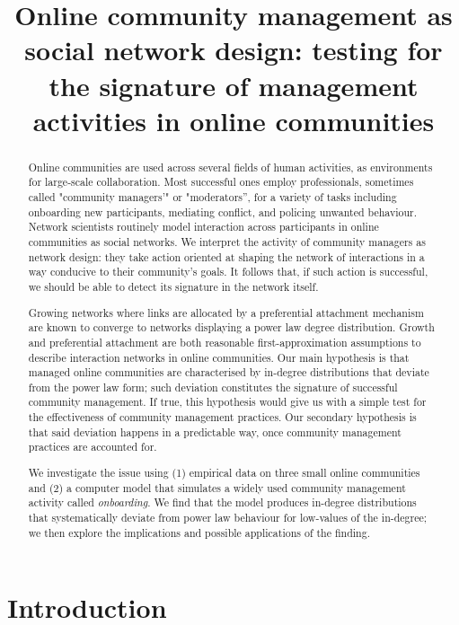\documentclass{nws}
\title[Online community management as social network design]{Online community management as social network design: testing for the signature of management activities in online communities}
\begin{document}
\label{firstpage}

\maketitle

\begin{abstract}
Online communities are used across several fields of human activities, as environments for large-scale collaboration. Most successful ones employ professionals, sometimes called "community managers'" or "moderators'', for a variety of tasks including onboarding new participants, mediating conflict, and policing unwanted behaviour. Network scientists routinely model interaction across participants in online communities as social networks. We interpret the activity of community managers as network design: they take action oriented at shaping the network of interactions in a way conducive to their community's goals. It follows that, if such action is successful, we should be able to detect its signature in the network itself. 

Growing networks where links are allocated by a preferential attachment mechanism are known to converge to networks displaying a power law degree distribution. Growth and preferential attachment are both reasonable first-approximation assumptions to describe interaction networks in online communities. Our main hypothesis is that managed online communities are characterised by in-degree distributions that deviate from the power law form; such deviation constitutes the signature of successful community management. If true, this hypothesis would give us with a simple test for the effectiveness of community management practices. Our secondary hypothesis is that said deviation happens in a predictable way, once community management practices are accounted for. 

We investigate the issue using (1) empirical data on three small online communities and (2) a computer model that simulates a widely used community management activity called \emph{onboarding}. We find that the model produces in-degree distributions that systematically deviate from power law behaviour for low-values of the in-degree; we then explore the implications and possible applications of the finding. 
\end{abstract}

\tableofcontents

\section{Introduction}
\end{document}
